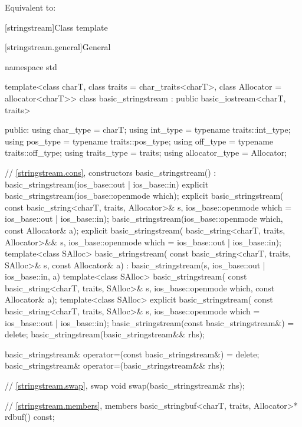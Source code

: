 \begin{itemdescr}
\pnum
\effects
Equivalent to: 
\end{itemdescr}

[stringstream]{Class template }

[stringstream.general]{General}

%
\begin{codeblock}
namespace std {
  template<class charT, class traits = char_traits<charT>,
           class Allocator = allocator<charT>>
  class basic_stringstream : public basic_iostream<charT, traits> {
  public:
    using char_type      = charT;
    using int_type       = typename traits::int_type;
    using pos_type       = typename traits::pos_type;
    using off_type       = typename traits::off_type;
    using traits_type    = traits;
    using allocator_type = Allocator;

    // \ref{stringstream.cons}, constructors
    basic_stringstream() : basic_stringstream(ios_base::out | ios_base::in) {}
    explicit basic_stringstream(ios_base::openmode which);
    explicit basic_stringstream(
      const basic_string<charT, traits, Allocator>& s,
      ios_base::openmode which = ios_base::out | ios_base::in);
    basic_stringstream(ios_base::openmode which, const Allocator& a);
    explicit basic_stringstream(
      basic_string<charT, traits, Allocator>&& s,
      ios_base::openmode which = ios_base::out | ios_base::in);
    template<class SAlloc>
      basic_stringstream(
        const basic_string<charT, traits, SAlloc>& s, const Allocator& a)
        : basic_stringstream(s, ios_base::out | ios_base::in, a) {}
    template<class SAlloc>
      basic_stringstream(
        const basic_string<charT, traits, SAlloc>& s,
        ios_base::openmode which, const Allocator& a);
    template<class SAlloc>
      explicit basic_stringstream(
        const basic_string<charT, traits, SAlloc>& s,
        ios_base::openmode which = ios_base::out | ios_base::in);
    basic_stringstream(const basic_stringstream&) = delete;
    basic_stringstream(basic_stringstream&& rhs);

    basic_stringstream& operator=(const basic_stringstream&) = delete;
    basic_stringstream& operator=(basic_stringstream&& rhs);

    // \ref{stringstream.swap}, swap
    void swap(basic_stringstream& rhs);

    // \ref{stringstream.members}, members
    basic_stringbuf<charT, traits, Allocator>* rdbuf() const;

}}
\end{codeblock}
